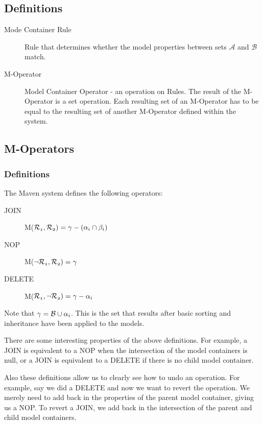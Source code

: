 \documentclass[12pt]{amsart}
\begin{document}
\subsection{Definitions}
\begin{description}
\item[Mode Container Rule] Rule that determines whether the model properties between sets \begin{math} \mathcal{A}\end{math} and  \begin{math} \mathcal{B}\end{math} match.  
\item[M-Operator] Model Container Operator - an operation on Rules. The result of the M-Operator is a set operation. Each resulting set of an M-Operator has to be equal to the resulting set of another M-Operator defined within the system.
\end{description}
\subsection{M-Operators}
\subsubsection{Definitions}
The Maven system defines the following operators:
\begin{description}
\item[JOIN]  M($\mathnormal{\mathcal{R}_{1},\mathcal{R}_{2} ) = \gamma - (\alpha_i \cap \beta_i)}$
\item[NOP] M($\mathnormal{\neg \mathcal{R}_{1}, \mathcal{R}_{2})  = \gamma} $ 
\item[DELETE] M($\mathnormal{\mathcal{R}_{1}, \neg \mathcal{R}_{2}) =  \gamma -\alpha_i} $ 
\end{description}
Note that $\mathnormal{\gamma=\mathcal{B}\cup \alpha_i}$. This is the set that results after basic sorting and inheritance have been applied to the models. 

There are some interesting properties of the above definitions. For example,  a JOIN is equivalent to a NOP when the intersection of the model containers is null, or a JOIN is equivalent to a DELETE if there is no child model container.

Also these definitions allow us to clearly see how to undo an operation. For example, say we did a DELETE and now we want to revert the operation. We merely need to add back in the properties of the parent model container, giving us a NOP. To revert a JOIN, we add back in the intersection of the parent and child model containers.
\end{document}
